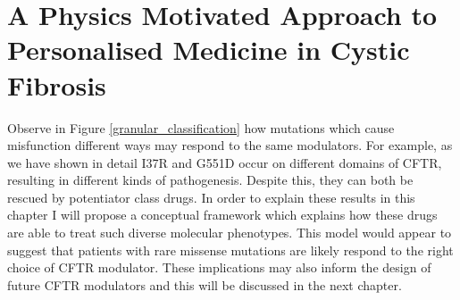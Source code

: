 \section{A Physics Motivated Approach to Personalised Medicine in Cystic Fibrosis}
Observe in Figure \ref{granular_classification} how mutations which cause misfunction different ways may respond to the same modulators. For example, as we have shown in detail I37R and G551D occur on different domains of CFTR, resulting in different kinds of pathogenesis. Despite this, they can both be rescued by potentiator class drugs. In order to explain these results in this chapter I will propose a conceptual framework which explains how these drugs are able to treat such diverse molecular phenotypes. This model would appear to suggest that patients with rare missense mutations are likely respond to the right choice of CFTR modulator. These implications may also inform the design of future CFTR modulators and this will be discussed in the next chapter. 

